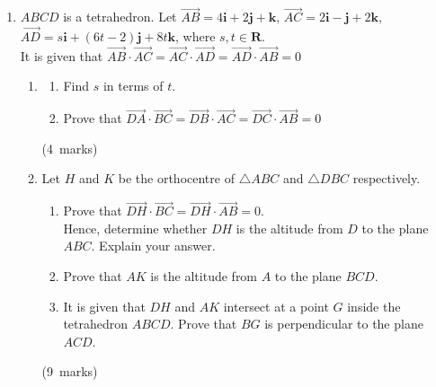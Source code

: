 \documentclass[12pt, a4paper]{article} %
\newcommand{\qmarks}[1]{\leavevmode\unskip\hspace*{\fill}\mbox{(#1 marks)}}
\begin{document}
\begin{enumerate}
    \item \(ABCD\) is a tetrahedron. Let \(\overrightarrow{AB}=4\mathbf{i}+2\mathbf{j}+\mathbf{k}\), \(\overrightarrow{AC}=2\mathbf{i}-\mathbf{j}+2\mathbf{k}\),\\
    \(\overrightarrow{AD}=s\mathbf{i}+(6t-2)\mathbf{j}+8t\mathbf{k}\), where \(s,t\in\mathbf{R}\).\\
    It is given that \(\overrightarrow{AB}\cdot\overrightarrow{AC}=\overrightarrow{AC}\cdot\overrightarrow{AD}=\overrightarrow{AD}\cdot\overrightarrow{AB}=0\)
    \begin{enumerate}
        \item \begin{enumerate}[label=(\roman*)]
            \item Find \(s\) in terms of \(t\).
            \item Prove that \(\overrightarrow{DA}\cdot\overrightarrow{BC}=\overrightarrow{DB}\cdot\overrightarrow{AC}=\overrightarrow{DC}\cdot\overrightarrow{AB}=0\)
        \end{enumerate}\qmarks{4}
        \item Let \(H\) and \(K\) be the orthocentre of \(\triangle ABC\) and \(\triangle DBC\) respectively.
        \begin{enumerate}[label=(\roman*)]
            \item Prove that \(\overrightarrow{DH}\cdot\overrightarrow{BC}=\overrightarrow{DH}\cdot\overrightarrow{AB}=0\).\\
            Hence, determine whether \(DH\) is the altitude from \(D\) to the plane \(ABC\). Explain your answer.
            \item Prove that \(AK\) is the altitude from \(A\) to the plane \(BCD\).
            \item It is given that \(DH\) and \(AK\) intersect at a point \(G\) inside the tetrahedron \(ABCD\). Prove that \(BG\) is perpendicular to the plane \(ACD\).
        \end{enumerate}\qmarks{9}
    \end{enumerate}
\end{enumerate}
\newpage
\end{document}
